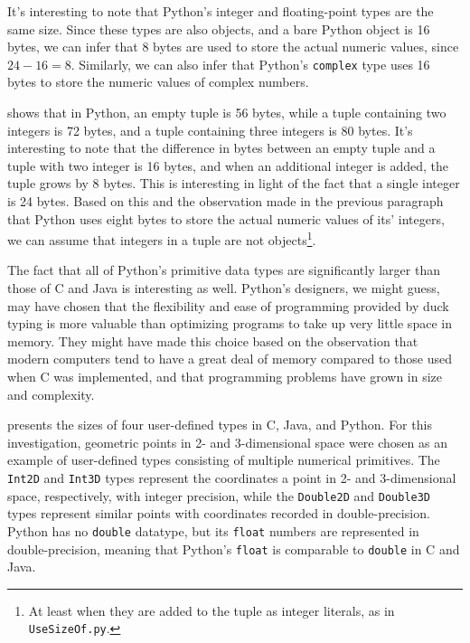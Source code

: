 \documentclass[12pt,letterpaper]{article}
\begin{document}
		It's interesting to note that Python's integer and floating-point types are the same size. Since these types are also objects, and a bare Python object is 16 bytes, we can infer that 8 bytes are used to store the actual numeric values, since $24 - 16 = 8$. Similarly, we can also infer that Python's \texttt{complex} type uses 16 bytes to store the numeric values of complex numbers. 

		 shows that in Python, an empty tuple is 56 bytes, while a tuple containing two integers is 72 bytes, and a tuple containing three integers is 80 bytes. It's interesting to note that the difference in bytes between an empty tuple and a tuple with two integer is 16 bytes, and when an additional integer is added, the tuple grows by 8 bytes. This is interesting in light of the fact that a single integer is 24 bytes. Based on this and the observation made in the previous paragraph that Python uses eight bytes to store the actual numeric values of its' integers, we can assume that integers in a tuple are not objects\footnote{At least when they are added to the tuple as integer literals, as in \texttt{UseSizeOf.py}.}.

		The fact that all of Python's primitive data types are significantly larger than those of C and Java is interesting as well. Python's designers, we might guess, may have chosen that the flexibility and ease of programming provided by duck typing is more valuable than optimizing programs to take up very little space in memory. They might have made this choice based on the observation that modern computers tend to have a great deal of memory compared to those used when C was implemented, and that programming problems have grown in size and complexity.

		 presents the sizes of four user-defined types in C, Java, and Python. For this investigation, geometric points in 2- and 3-dimensional space were chosen as an example of user-defined types consisting of multiple numerical primitives. The \texttt{Int2D} and \texttt{Int3D} types represent the coordinates a point in 2- and 3-dimensional space, respectively, with integer precision, while the \texttt{Double2D} and \texttt{Double3D} types represent similar points with coordinates recorded in double-precision. Python has no \texttt{double} datatype, but its \texttt{float} numbers are represented in double-precision, meaning that Python's \texttt{float} is comparable to \texttt{double} in C and Java.
\end{document}
